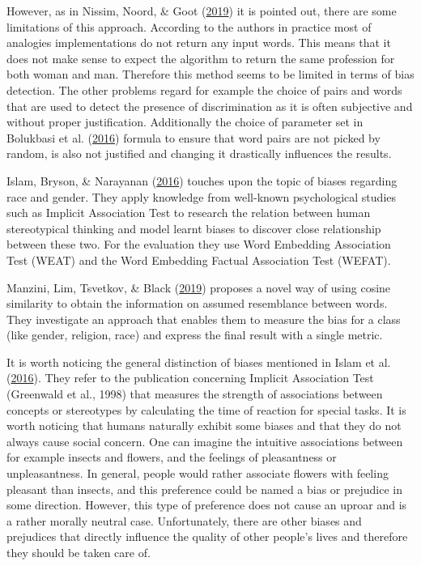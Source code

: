 \documentclass[12pt,]{book}
\begin{document}
However, as in Nissim, Noord, \& Goot
(\protect\hyperlink{ref-Nissim2019Fair}{2019}) it is pointed out, there
are some limitations of this approach. According to the authors in
practice most of analogies implementations do not return any input
words. This means that it does not make sense to expect the algorithm to
return the same profession for both woman and man. Therefore this method
seems to be limited in terms of bias detection. The other problems
regard for example the choice of pairs and words that are used to detect
the presence of discrimination as it is often subjective and without
proper justification. Additionally the choice of parameter set in
Bolukbasi et al. (\protect\hyperlink{ref-Bolukbasi2016Man}{2016})
formula to ensure that word pairs are not picked by random, is also not
justified and changing it drastically influences the results.

Islam, Bryson, \& Narayanan
(\protect\hyperlink{ref-Caliskan2017Semantics}{2016}) touches upon the
topic of biases regarding race and gender. They apply knowledge from
well-known psychological studies such as Implicit Association Test to
research the relation between human stereotypical thinking and model
learnt biases to discover close relationship between these two. For the
evaluation they use Word Embedding Association Test (WEAT) and the Word
Embedding Factual Association Test (WEFAT).

Manzini, Lim, Tsvetkov, \& Black
(\protect\hyperlink{ref-manzini2019black}{2019}) proposes a novel way of
using cosine similarity to obtain the information on assumed resemblance
between words. They investigate an approach that enables them to measure
the bias for a class (like gender, religion, race) and express the final
result with a single metric.

It is worth noticing the general distinction of biases mentioned in
Islam et al. (\protect\hyperlink{ref-Caliskan2017Semantics}{2016}). They
refer to the publication concerning Implicit Association Test (Greenwald
et al., 1998) that measures the strength of associations between
concepts or stereotypes by calculating the time of reaction for special
tasks. It is worth noticing that humans naturally exhibit some biases
and that they do not always cause social concern. One can imagine the
intuitive associations between for example insects and flowers, and the
feelings of pleasantness or unpleasantness. In general, people would
rather associate flowers with feeling pleasant than insects, and this
preference could be named a bias or prejudice in some direction.
However, this type of preference does not cause an uproar and is a
rather morally neutral case. Unfortunately, there are other biases and
prejudices that directly influence the quality of other people's lives
and therefore they should be taken care of.
\end{document}

